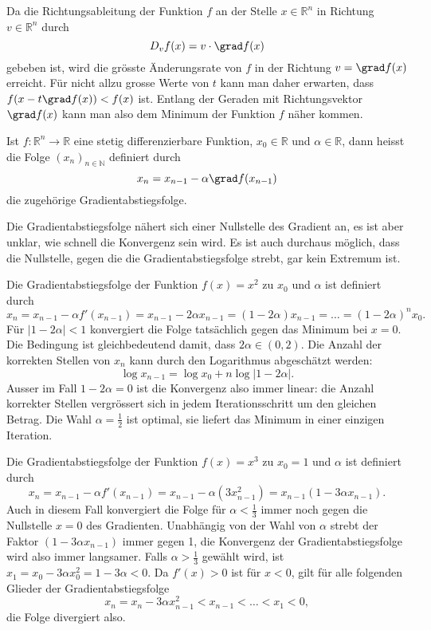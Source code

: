 Da die Richtungsableitung der Funktion $f$ an der Stelle $x\in\mathbb{R}^n$
in Richtung $v\in\mathbb{R}^n$ durch
\[
D_vf(x)
=
v\cdot \grad f(x)
\]
gebeben ist, wird die grösste Änderungsrate von $f$ in der Richtung
$v=\grad f(x)$ erreicht.
Für nicht allzu grosse Werte von $t$ kann man daher erwarten, dass
\(
f(x-t\grad f(x))
<
f(x)
\)
ist.
Entlang der Geraden mit Richtungsvektor $\grad f(x)$ kann man also
dem Minimum der Funktion $f$ näher kommen.

\begin{definition}[Gradientabstieg]
%
Ist $f\colon\mathbb{R}^n\to\mathbb{R}$ eine stetig differenzierbare
Funktion, $x_0\in\mathbb{R}$ und $\alpha\in\mathbb{R}$, dann heisst
die Folge $(x_n)_{n\in\mathbb{N}}$ definiert durch
\[
x_n = x_{n-1} - \alpha \grad f(x_{n-1})
\]
die zugehörige Gradientabstiegsfolge.
\end{definition}

Die Gradientabstiegsfolge nähert sich einer Nullstelle des Gradient
an, es ist aber unklar, wie schnell die Konvergenz sein wird.
Es ist auch durchaus möglich, dass die Nullstelle, gegen die die
Gradientabstiegsfolge strebt, gar kein Extremum ist.

\begin{beispiel}
Die Gradientabstiegsfolge der Funktion $f(x)=x^2$ zu $x_0$ und $\alpha$ ist
definiert durch
\[
x_n
=
x_{n-1}  -\alpha f'(x_{n-1})
=
x_{n-1}  -2\alpha x_{n-1}
=
(1-2\alpha)x_{n-1}
=
\dots
=
(1-2\alpha)^n x_0.
\]
Für $|1-2\alpha|< 1$ konvergiert die Folge tatsächlich gegen das
Minimum bei $x=0$.
Die Bedingung ist gleichbedeutend damit, dass $2\alpha\in(0,2)$.
Die Anzahl der korrekten Stellen von $x_n$ kann durch den
Logarithmus abgeschätzt werden:
\[
\log x_{n-1}
=
\log x_0 + n \log|1-2\alpha|.
\]
Ausser im Fall $1-2\alpha=0$ ist die Konvergenz also immer linear:
die Anzahl korrekter Stellen vergrössert sich in jedem Iterationsschritt
um den gleichen Betrag.
Die Wahl $\alpha = \frac12$ ist optimal, sie liefert das Minimum in
einer einzigen Iteration.
\end{beispiel}

\begin{beispiel}
Die Gradientabstiegsfolge der Funktion $f(x)=x^3$ zu $x_0=1$ und $\alpha$
ist definiert durch
\[
x_n
=
x_{n-1} - \alpha f'(x_{n-1})
=
x_{n-1} - \alpha (3x_{n-1}^2)
=
x_{n-1}(1-3\alpha x_{n-1}).
\]
Auch in diesem Fall konvergiert die Folge für $\alpha < \frac13$ immer
noch gegen die Nullstelle $x=0$ des Gradienten.
Unabhängig von der Wahl von $\alpha$ strebt der Faktor
$(1-3\alpha x_{n-1})$ immer gegen 1, die Konvergenz der Gradientabstiegsfolge
wird also immer langsamer.
Falls $\alpha > \frac13$ gewählt wird, ist $x_1=x_0-3\alpha x_0^2=1-3\alpha<0$.
Da $f'(x)>0$ ist für $x<0$, gilt für alle folgenden Glieder der
Gradientabstiegsfolge
\[
x_{n} = x_n-3\alpha x_{n-1}^2 < x_{n-1} < \dots < x_1 < 0,
\]
die Folge divergiert also.
\end{beispiel}

